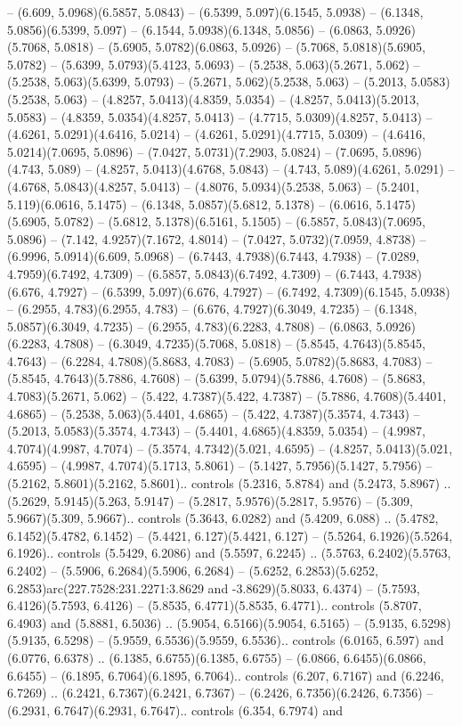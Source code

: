 -- (6.609, 5.0968)(6.5857, 5.0843) -- (6.5399, 5.097)(6.1545, 5.0938) -- (6.1348, 5.0856)(6.5399, 5.097) -- (6.1544, 5.0938)(6.1348, 5.0856) -- (6.0863, 5.0926)(5.7068, 5.0818) -- (5.6905, 5.0782)(6.0863, 5.0926) -- (5.7068, 5.0818)(5.6905, 5.0782) -- (5.6399, 5.0793)(5.4123, 5.0693) -- (5.2538, 5.063)(5.2671, 5.062) -- (5.2538, 5.063)(5.6399, 5.0793) -- (5.2671, 5.062)(5.2538, 5.063) -- (5.2013, 5.0583)(5.2538, 5.063) -- (4.8257, 5.0413)(4.8359, 5.0354) -- (4.8257, 5.0413)(5.2013, 5.0583) -- (4.8359, 5.0354)(4.8257, 5.0413) -- (4.7715, 5.0309)(4.8257, 5.0413) -- (4.6261, 5.0291)(4.6416, 5.0214) -- (4.6261, 5.0291)(4.7715, 5.0309) -- (4.6416, 5.0214)(7.0695, 5.0896) -- (7.0427, 5.0731)(7.2903, 5.0824) -- (7.0695, 5.0896)(4.743, 5.089) -- (4.8257, 5.0413)(4.6768, 5.0843) -- (4.743, 5.089)(4.6261, 5.0291) -- (4.6768, 5.0843)(4.8257, 5.0413) -- (4.8076, 5.0934)(5.2538, 5.063) -- (5.2401, 5.119)(6.0616, 5.1475) -- (6.1348, 5.0857)(5.6812, 5.1378) -- (6.0616, 5.1475)(5.6905, 5.0782) -- (5.6812, 5.1378)(6.5161, 5.1505) -- (6.5857, 5.0843)(7.0695, 5.0896) -- (7.142, 4.9257)(7.1672, 4.8014) -- (7.0427, 5.0732)(7.0959, 4.8738) -- (6.9996, 5.0914)(6.609, 5.0968) -- (6.7443, 4.7938)(6.7443, 4.7938) -- (7.0289, 4.7959)(6.7492, 4.7309) -- (6.5857, 5.0843)(6.7492, 4.7309) -- (6.7443, 4.7938)(6.676, 4.7927) -- (6.5399, 5.097)(6.676, 4.7927) -- (6.7492, 4.7309)(6.1545, 5.0938) -- (6.2955, 4.783)(6.2955, 4.783) -- (6.676, 4.7927)(6.3049, 4.7235) -- (6.1348, 5.0857)(6.3049, 4.7235) -- (6.2955, 4.783)(6.2283, 4.7808) -- (6.0863, 5.0926)(6.2283, 4.7808) -- (6.3049, 4.7235)(5.7068, 5.0818) -- (5.8545, 4.7643)(5.8545, 4.7643) -- (6.2284, 4.7808)(5.8683, 4.7083) -- (5.6905, 5.0782)(5.8683, 4.7083) -- (5.8545, 4.7643)(5.7886, 4.7608) -- (5.6399, 5.0794)(5.7886, 4.7608) -- (5.8683, 4.7083)(5.2671, 5.062) -- (5.422, 4.7387)(5.422, 4.7387) -- (5.7886, 4.7608)(5.4401, 4.6865) -- (5.2538, 5.063)(5.4401, 4.6865) -- (5.422, 4.7387)(5.3574, 4.7343) -- (5.2013, 5.0583)(5.3574, 4.7343) -- (5.4401, 4.6865)(4.8359, 5.0354) -- (4.9987, 4.7074)(4.9987, 4.7074) -- (5.3574, 4.7342)(5.021, 4.6595) -- (4.8257, 5.0413)(5.021, 4.6595) -- (4.9987, 4.7074)(5.1713, 5.8061) -- (5.1427, 5.7956)(5.1427, 5.7956) -- (5.2162, 5.8601)(5.2162, 5.8601).. controls (5.2316, 5.8784) and (5.2473, 5.8967) .. (5.2629, 5.9145)(5.263, 5.9147) -- (5.2817, 5.9576)(5.2817, 5.9576) -- (5.309, 5.9667)(5.309, 5.9667).. controls (5.3643, 6.0282) and (5.4209, 6.088) .. (5.4782, 6.1452)(5.4782, 6.1452) -- (5.4421, 6.127)(5.4421, 6.127) -- (5.5264, 6.1926)(5.5264, 6.1926).. controls (5.5429, 6.2086) and (5.5597, 6.2245) .. (5.5763, 6.2402)(5.5763, 6.2402) -- (5.5906, 6.2684)(5.5906, 6.2684) -- (5.6252, 6.2853)(5.6252, 6.2853)arc(227.7528:231.2271:3.8629 and -3.8629)(5.8033, 6.4374) -- (5.7593, 6.4126)(5.7593, 6.4126) -- (5.8535, 6.4771)(5.8535, 6.4771).. controls (5.8707, 6.4903) and (5.8881, 6.5036) .. (5.9054, 6.5166)(5.9054, 6.5165) -- (5.9135, 6.5298)(5.9135, 6.5298) -- (5.9559, 6.5536)(5.9559, 6.5536).. controls (6.0165, 6.597) and (6.0776, 6.6378) .. (6.1385, 6.6755)(6.1385, 6.6755) -- (6.0866, 6.6455)(6.0866, 6.6455) -- (6.1895, 6.7064)(6.1895, 6.7064).. controls (6.207, 6.7167) and (6.2246, 6.7269) .. (6.2421, 6.7367)(6.2421, 6.7367) -- (6.2426, 6.7356)(6.2426, 6.7356) -- (6.2931, 6.7647)(6.2931, 6.7647).. controls (6.354, 6.7974) and 